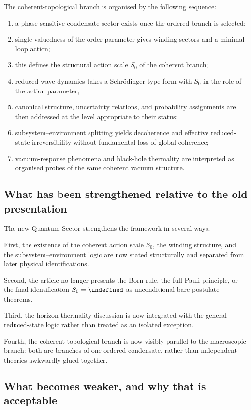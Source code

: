 \documentclass[11pt,a4paper]{article}
\let\hbar\undefined
\numberwithin{equation}{section}
\begin{document}
The coherent-topological branch is organised by the following sequence:
\begin{enumerate}[label=(\roman*)]
  \item a phase-sensitive condensate sector exists once the ordered
  branch is selected;
  \item single-valuedness of the order parameter gives winding sectors
  and a minimal loop action;
  \item this defines the structural action scale $S_0$ of the coherent
  branch;
  \item reduced wave dynamics takes a Schr\"odinger-type form with
  $S_0$ in the role of the action parameter;
  \item canonical structure, uncertainty relations, and probability
  assignments are then addressed at the level appropriate to their
  status;
  \item subsystem--environment splitting yields decoherence and
  effective reduced-state irreversibility without fundamental loss of
  global coherence;
  \item vacuum-response phenomena and black-hole thermality are
  interpreted as organised probes of the same coherent vacuum structure.
\end{enumerate}

\subsection*{What has been strengthened relative to the old presentation}

The new Quantum Sector strengthens the framework in several ways.

First, the existence of the coherent action scale $S_0$, the winding
structure, and the subsystem--environment logic are now stated
structurally and separated from later physical identifications.

Second, the article no longer presents the Born rule, the full Pauli
principle, or the final identification $S_0=\hbar$ as unconditional
bare-postulate theorems.

Third, the horizon-thermality discussion is now integrated with the
general reduced-state logic rather than treated as an isolated
exception.

Fourth, the coherent-topological branch is now visibly parallel to the
macroscopic branch: both are branches of one ordered condensate, rather
than independent theories awkwardly glued together.

\subsection*{What becomes weaker, and why that is acceptable}
\end{document}
